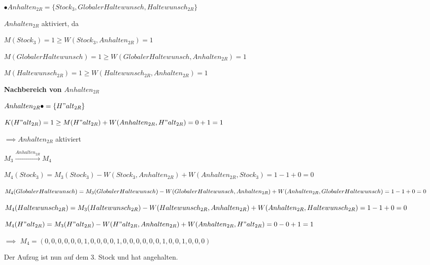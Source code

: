 \documentclass{scrreprt}
\begin{document}
\begin{enumerate}
\begin{addmargin}[1cm]{0cm}
  $\bullet Anhalten_{2R} = \{ Stock_3, GlobalerHaltewunsch, Haltewunsch_{2R} \}$

  $Anhalten_{2R}$ aktiviert, da

  $M(Stock_3) = 1 \geq W(Stock_3, Anhalten_{2R}) = 1$  

  $M(GlobalerHaltewunsch) = 1 \geq W(GlobalerHaltewunsch, Anhalten_{2R}) = 1$

  $M(Haltewunsch_{2R}) = 1 \geq W(Haltewunsch_{2R}, Anhalten_{2R}) = 1$
\end{addmargin}

\textbf{Nachbereich von $Anhalten_{2R}$}

\begin{addmargin}[1cm]{0cm}
  $Anhalten_{2R} \bullet = \{ H"alt_{2R} \}$

  $K(H"alt_{2R}) = 1 \geq M(H"alt_{2R}) + W(Anhalten_{2R}, H"alt_{2R}) = 0 + 1 = 1$

  $\implies Anhalten_{2R}$ aktiviert
\end{addmargin}

$M_3 \xrightarrow{Anhalten_{2R}} M_4$

\begin{addmargin}[1cm]{0cm}
  $M_4(Stock_3) = M_3(Stock_3) - W(Stock_3, Anhalten_{2R}) + W(Anhalten_{2R}, Stock_3) = 1 - 1 + 0 = 0$

  $M_4(GlobalerHaltewunsch) = M_3(GlobalerHaltewunsch) - \\ W(GlobalerHaltewunsch, Anhalten_{2R}) + \\ W(Anhalten_{2R}, GlobalerHaltewunsch) = 1 - 1 + 0 = 0$

  $M_4(Haltewunsch_{2R}) = M_3(Haltewunsch_{2R}) - \\ W(Haltewunsch_{2R}, Anhalten_{2R}) + \\ W(Anhalten_{2R}, Haltewunsch_{2R}) = 1 - 1 + 0 = 0$

  $M_4(H"alt_{2R}) = M_3(H"alt_{2R}) - \\ W(H"alt_{2R}, Anhalten_{2R}) + W(Anhalten_{2R}, H"alt_{2R}) = 0 - 0 + 1 = 1$

  $\implies$ 
  $M_4 = (
  0, 0, 0, 0, 0, 
  0, 1, 0, 0, 0, 
  0, 1, 0, 0, 0, 
  0, 0, 0, 1, 0, 
  0, 1, 0, 0, 0
  )$
\end{addmargin}

Der Aufzug ist nun auf dem 3. Stock und hat angehalten.

\end{enumerate}
\end{document}
